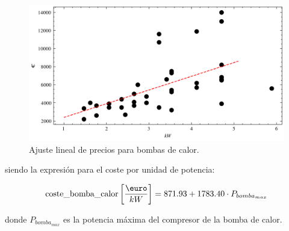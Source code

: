 \begin{figure}[h] \centering
	\centering
	\includegraphics[width=1\textwidth]{./capitulos/adquisicion_de_datos/images/heat_pump_regression.png}
	\caption{Ajuste lineal de precios para bombas de calor.}
	\label{fig:heat_pump_regression}
\end{figure}


siendo la expresión para el coste por unidad de potencia:

\begin{equation}
	\text{coste\_bomba\_calor} \left[\frac{\text{\euro}}{kW}\right] = 871.93 + 1783.40 \cdot P_{bomba_{max}}
\end{equation}

donde $P_{bomba_{max}}$ es la potencia máxima del compresor de la bomba de calor.
